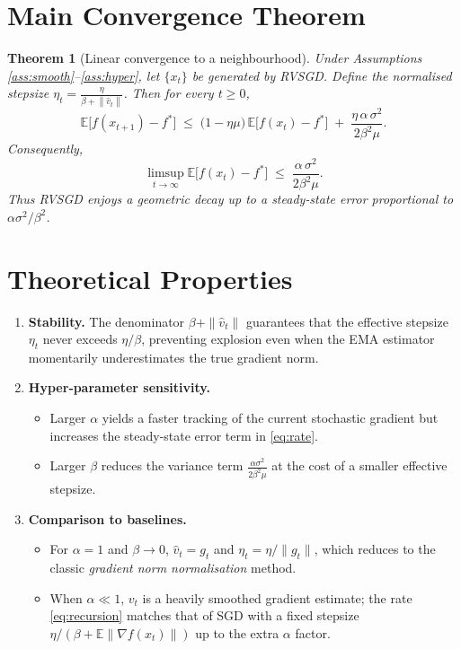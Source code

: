 \documentclass{article}
\newtheorem{theorem}{Theorem}
\newcommand{\E}{\mathbb{E}}
\newcommand{\norm}[1]{\left\lVert#1\right\rVert}
\begin{document}
\section*{Main Convergence Theorem}
\begin{theorem}[Linear convergence to a neighbourhood]\label{thm:main}
Under Assumptions \ref{ass:smooth}–\ref{ass:hyper},
let $\{x_t\}$ be generated by RVSGD.
Define the normalised stepsize $\displaystyle \eta_t=
\frac{\eta}{\beta+\norm{\hat v_t}}$.
Then for every $t\ge 0$,
\begin{equation}
\label{eq:recursion}
\E\bigl[f(x_{t+1})-f^{*}\bigr]
\;\le\;
\bigl(1-\eta\mu\bigr)\,
\E\bigl[f(x_{t})-f^{*}\bigr]
\;+\;
\frac{\eta\,\alpha\,\sigma^{2}}{2\beta^{2}\mu}.
\end{equation}
Consequently,
\begin{equation}
\label{eq:rate}
\limsup_{t\to\infty}\E\bigl[f(x_{t})-f^{*}\bigr]
\;\le\;
\frac{\alpha\,\sigma^{2}}{2\beta^{2}\mu}.
\end{equation}
Thus RVSGD enjoys a \emph{geometric} decay up to a steady‑state error
proportional to $\alpha\sigma^{2}/\beta^{2}$.
\end{theorem}

\section*{Theoretical Properties}
\begin{enumerate}[label=\arabic*.]
\item \textbf{Stability.} The denominator $\beta+\|\hat v_t\|$ guarantees that the
effective stepsize $\eta_t$ never exceeds $\eta/\beta$, preventing explosion
even when the EMA estimator momentarily underestimates the true gradient norm.
\item \textbf{Hyper‑parameter sensitivity.}
\begin{itemize}
\item Larger $\alpha$ yields a faster tracking of the current stochastic gradient
but increases the steady‑state error term in \eqref{eq:rate}.
\item Larger $\beta$ reduces the variance term $\frac{\alpha\sigma^{2}}{2\beta^{2}\mu}$ at the cost of a smaller effective stepsize.
\end{itemize}
\item \textbf{Comparison to baselines.}
\begin{itemize}
\item For $\alpha=1$ and $\beta\to0$, $\hat v_t=g_t$ and $\eta_t=\eta/\|g_t\|$,
which reduces to the classic \emph{gradient norm normalisation} method.
\item When $\alpha\ll1$, $v_t$ is a heavily smoothed gradient estimate;
the rate \eqref{eq:recursion} matches that of SGD with a fixed stepsize
$\eta/(\beta+ \E\|\nabla f(x_t)\|)$ up to the extra $\alpha$ factor.
\end{itemize}
\end{enumerate}
\end{document}
